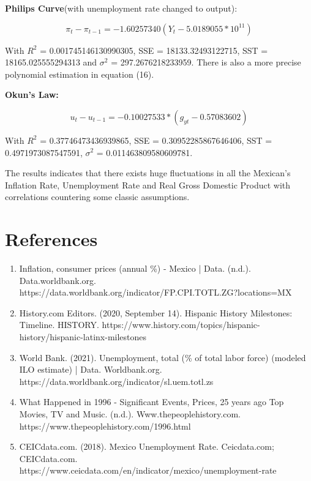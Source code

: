 \documentclass{article}
\begin{document}
    {\textbf{Philips Curve}(with unemployment rate changed to output):}

    \begin{equation}
        \pi_t - \pi_{t-1} = -1.60257340 (Y_t - 5.0189055 * 10^{11})
    \end{equation}

    {With $R^2$ = 0.001745146130990305, SSE = 18133.32493122715, SST = 18165.025555294313 and $\sigma^2$ = 297.2676218233959. There is also a more precise polynomial estimation in equation (16).}

    \vspace{5mm}

    \textbf{Okun's Law:}

    \begin{equation}
        u_t - u_{t-1} = - 0.10027533 * (g_{yt} - 0.57083602)
    \end{equation}

    {With $R^2$ = 0.37746473436939865, SSE = 0.30952285867646406, SST = 0.4971973087547591, $\sigma^2$ = 0.011463809580609781.}

    \vspace{5mm}
    
    {The results indicates that there exists huge fluctuations in all the Mexican's Inflation Rate, Unemployment Rate and Real Gross Domestic Product with correlations countering some classic assumptions.}
    
\section*{References}
    
    \begin{enumerate}
        \item{Inflation, consumer prices (annual \%) - Mexico | Data. (n.d.). Data.worldbank.org. \\ https://data.worldbank.org/indicator/FP.CPI.TOTL.ZG?locations=MX}
        
        \item{History.com Editors. (2020, September 14). Hispanic History Milestones: Timeline. HISTORY. https://www.history.com/topics/hispanic-history/hispanic-latinx-milestones}
        
        \item{World Bank. (2021). Unemployment, total (\% of total labor force) (modeled ILO estimate) | Data. Worldbank.org. https://data.worldbank.org/indicator/sl.uem.totl.zs}
        
        \item{What Happened in 1996 - Significant Events, Prices, 25 years ago Top Movies, TV and Music. (n.d.). Www.thepeoplehistory.com. https://www.thepeoplehistory.com/1996.html}
        
        \item{CEICdata.com. (2018). Mexico Unemployment Rate. Ceicdata.com; CEICdata.com. \\
        https://www.ceicdata.com/en/indicator/mexico/unemployment-rate}
    \end{enumerate}
\end{document}

